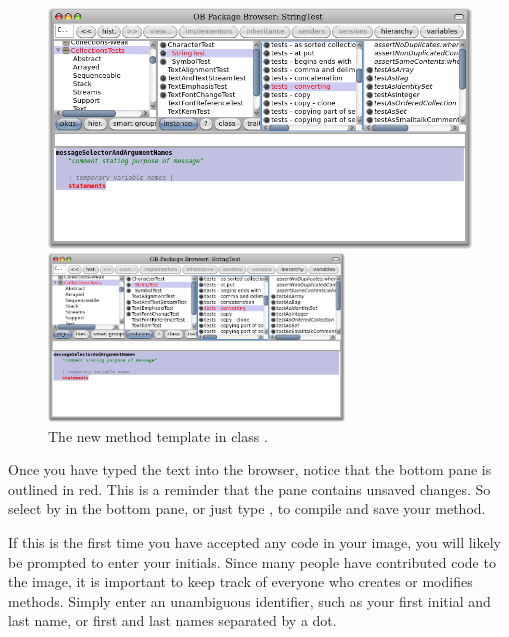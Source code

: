 \documentclass[a4paper,10pt,twoside]{book}
\begin{document}
\begin{figure}[hbt]
\ifluluelse
	{\centerline {\includegraphics[width=\textwidth]{StringTest-newMethodTemplate}}}
	{\centerline {\includegraphics[width=0.7\textwidth]{StringTest-newMethodTemplate}}}
\caption{The new method template in class .
\label{fig:newMethodTemplate}}
\end{figure}

Once you have typed the text into the browser, notice that the bottom pane is outlined in red.  This is a reminder that the pane contains unsaved changes.
So select  by  in the bottom pane, or just type , to compile and save your method.

If this is the first time you have accepted any code in your image, you will likely be prompted to enter your initials. Since many people have contributed code to the image, it is important to keep track of everyone who creates or modifies methods. Simply enter an unambiguous identifier, such as your first initial and last name, or first and last names separated by a dot.
\end{document}
